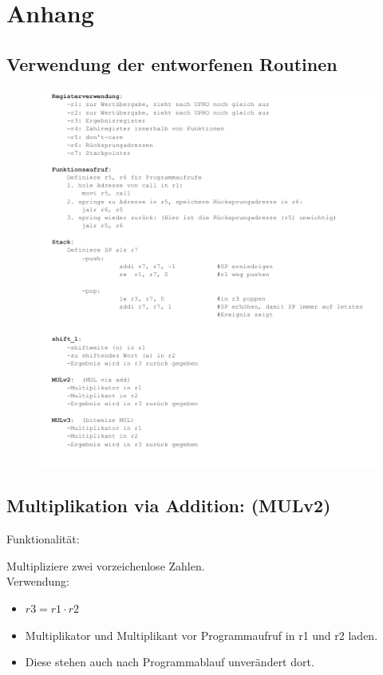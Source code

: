 \documentclass[fleqn, a4paper, 1pt]{article}       %
\begin{document}
\section{Anhang}
\subsection{Verwendung der entworfenen Routinen}

\begin{figure}[h]
    \includegraphics[width =1\textwidth]{Manual.png}
\label{fig:bitw_Mul_Prinzip}
\end{figure}

\newpage

\subsection{Multiplikation via Addition: (MULv2)}
Funktionalität:

Multipliziere zwei vorzeichenlose Zahlen.
\\

\noindent Verwendung:
\begin{itemize}
	\item $r3 = r1 \cdot r2$
	\item Multiplikator und Multiplikant vor Programmaufruf  in r1                und r2 laden.
	\item Diese stehen auch nach Programmablauf unverändert                dort.
\end{itemize}
\end{document}

